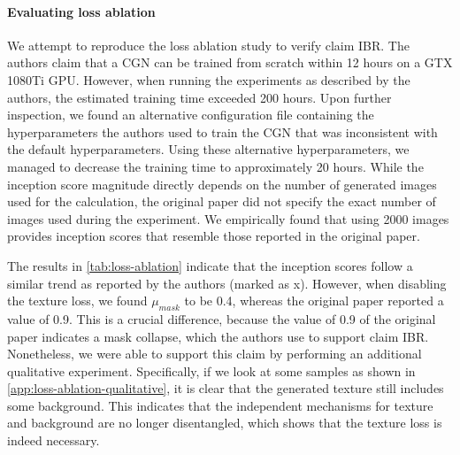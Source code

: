 \paragraph{Evaluating loss ablation} We attempt to reproduce the loss ablation study to verify claim IBR. The authors claim that a CGN can be trained from scratch within 12 hours on a GTX 1080Ti GPU. However, when running the experiments as described by the authors, the estimated training time exceeded 200 hours. Upon further inspection, we found an alternative configuration file containing the hyperparameters the authors used to train the CGN that was inconsistent with the default hyperparameters. Using these alternative hyperparameters, we managed to decrease the training time to approximately 20 hours.
While the inception score magnitude directly depends on the number of generated images used for the calculation, the original paper did not specify the exact number of images used during the experiment. We empirically found that using 2000 images provides inception scores that resemble those reported in the original paper.

The results in \cref{tab:loss-ablation} indicate that the inception scores follow a similar trend as reported by the authors (marked as \colorbox{blue!10}{x}). However, when disabling the texture loss, we found $\mu_{mask}$ to be 0.4, whereas the original paper reported a value of 0.9. This is a crucial difference, because the value of 0.9 of the original paper indicates a mask collapse, which the authors use to support claim IBR. Nonetheless, we were able to support this claim by performing an additional qualitative experiment. Specifically, if we look at some samples as shown in \cref{app:loss-ablation-qualitative}, it is clear that the generated texture still includes some background. This indicates that the independent mechanisms for texture and background are no longer disentangled, which shows that the texture loss is indeed necessary.



